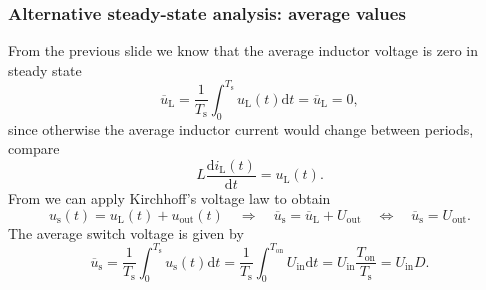 \begin{frame}
    \frametitle{Alternative steady-state analysis: average values}
    From the previous slide we know that the average inductor voltage is zero in steady state
    \begin{equation}
        \overline{u}_\mathrm{L} = \frac{1}{T_\mathrm{s}} \int_{0}^{T_\mathrm{s}} u_\mathrm{L}(t) \mathrm{d}t = \overline{u}_\mathrm{L} = 0,
    \end{equation}
    since otherwise the average inductor current would change between periods, compare
    $$
    L \frac{\mathrm{d}i_\mathrm{L}(t)}{\mathrm{d}t} =  u_\mathrm{L}(t).
    $$
    From  we can apply Kirchhoff's voltage law to obtain
    \begin{equation}
        u_\mathrm{s}(t) = u_\mathrm{L}(t) + u_\mathrm{out}(t) \quad \Rightarrow \quad \overline{u}_\mathrm{s} = \overline{u}_\mathrm{L} + U_\mathrm{out} \quad \Leftrightarrow \quad  \overline{u}_\mathrm{s} = U_\mathrm{out}.
        \label{eq:Kirchhoff-switch-voltage}
    \end{equation}
    The average switch voltage is given by
    \begin{equation}
        \overline{u}_\mathrm{s} = \frac{1}{T_\mathrm{s}} \int_{0}^{T_\mathrm{s}} u_\mathrm{s}(t) \mathrm{d}t = \frac{1}{T_\mathrm{s}} \int_{0}^{T_\mathrm{on}} U_\mathrm{in} \mathrm{d}t = U_\mathrm{in} \frac{T_\mathrm{on}}{T_\mathrm{s}} = U_\mathrm{in} D.
        \label{eq:average-switch-voltage}
    \end{equation}
\end{frame}

